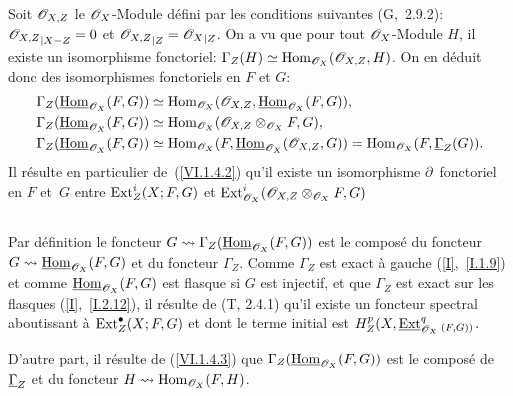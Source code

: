 \subsection{} \label{VI.1.4}
Soit ${\mathscr O}_{X, Z}$ le $\mathscr{O}_X$-Module d\'efini par les conditions suivantes (G,~2.9.2): ${{\mathscr O}_{X, Z}}_{|X{-} Z}=0$ et ${{\mathscr O}_{X, Z}}_{|Z}={\mathscr{O}_X}_{|Z}$. On a vu que pour tout $\mathscr{O}_X$-Module $H$, il existe un isomorphisme fonctoriel: $\Gamma_Z(H)\simeq \operatorname{Hom}_{\mathscr{O}_X}({\mathscr O}_{X, Z}, H)$. On en d\'eduit donc des isomorphismes fonctoriels en $F$ et $G$: \setcounter{equation}{0}
\begin{align}
\label{VI.1.4.1}
\Gamma_Z(\mathop{\underline{\mathrm{Hom}}}\nolimits_{\mathscr{O}_X}(F, G)) &\simeq \operatorname{Hom}_{\mathscr{O}_X}({\mathscr O}_{X, Z}, \mathop{\underline{\mathrm{Hom}}}\nolimits_{\mathscr{O}_X}(F, G)),\\
\label{VI.1.4.2} \Gamma_Z(\mathop{\underline{\mathrm{Hom}}}\nolimits_{\mathscr{O}_X}(F, G)) &\simeq \operatorname{Hom}_{\mathscr{O}_X}({\mathscr O}_{X, Z}\otimes_{\mathscr{O}_X} F, G),\\
\label{VI.1.4.3} \Gamma_Z(\mathop{\underline{\mathrm{Hom}}}\nolimits_{\mathscr{O}_X}(F, G)) &\simeq \operatorname{Hom}_{\mathscr{O}_X}(F, \mathop{\underline{\mathrm{Hom}}}\nolimits_{\mathscr{O}_X}({\mathscr O}_{X, Z}, G))=\operatorname{Hom}_{\mathscr{O}_X}(F, \underline{\Gamma}_Z(G)).
\end{align}
Il r\'esulte en particulier de~(\ref{VI.1.4.2}) qu'il existe un isomorphisme $\partial$~fonctoriel en $F$ et~$G$ entre $\operatorname{Ext}_{Z}^i(X;F, G)$ et $\operatorname{Ext}_{{\mathscr{O}_X}}^i({\mathscr O}_{X, Z}\otimes_{\mathscr{O}_X} F, G)$

\subsection{} \label{VI.1.5}
Par d\'efinition le foncteur $G \rightsquigarrow \Gamma_Z(\mathop{\underline{\mathrm{Hom}}}\nolimits_{\mathscr{O}_X}(F, G))$ est le compos\'e du foncteur $G \rightsquigarrow\mathop{\underline{\mathrm{Hom}}}\nolimits_{\mathscr{O}_X}(F, G)$ et du foncteur $\Gamma_Z$. Comme $\Gamma_Z$ est exact \`a gauche (\ref{I},~\ref{I.1.9}) et comme $\mathop{\underline{\mathrm{Hom}}}\nolimits_{\mathscr{O}_X}(F, G)$ est flasque si $G$ est injectif, et que $\Gamma_Z$ est exact sur les flasques (\ref{I},~\ref{I.2.12}), il r\'esulte de (T, 2.4.1) qu'il existe un foncteur spectral aboutissant \`a $\operatorname{Ext}_{Z}^\bullet(X;F, G)$ et dont le terme initial est $H_Z^p(X, \mathop{\underline{\mathrm{Ext}}}\nolimits_{\mathscr{O}_X}^q{}_{(F, G))}$.

D'autre part, il r\'esulte de (\ref{VI.1.4.3}) que $\Gamma_Z(\mathop{\underline{\mathrm{Hom}}}\nolimits_{\mathscr{O}_X}(F, G))$ est le compos\'e de $\underline{\Gamma}_Z$ et du foncteur $H \rightsquigarrow \operatorname{Hom}_{\mathscr{O}_X}(F, H)$.


